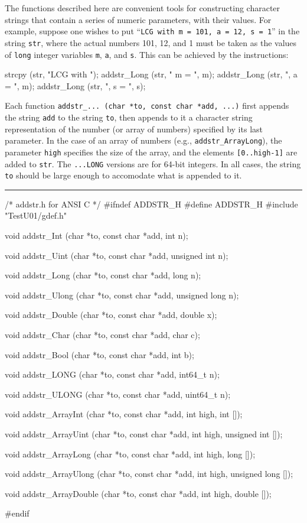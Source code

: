 
The functions described here are convenient tools for constructing
character strings that contain a series of numeric parameters,
with their values.
For example, suppose one wishes to put
``{\tt LCG with m = 101, a = 12, s = 1}'' in the string {\tt str},
where the actual
numbers 101, 12, and 1 must be taken as the values of {\tt long}
integer variables {\tt m}, {\tt a}, and {\tt s}.
This can be achieved by the instructions:
\vcode

   strcpy (str, "LCG with ");
   addstr\_Long (str, " m = ", m);
   addstr\_Long (str, ", a = ", m);
   addstr\_Long (str, ", s = ", s);
\endvcode

Each function {\tt addstr\_... (char *to, const char *add, ...)}
first appends the string {\tt add} to the string {\tt to}, then
appends to it a character string representation of the number
(or array of numbers) specified by its last parameter.
In the case of an array of numbers (e.g., {\tt addstr\_ArrayLong}),
the parameter {\tt high} specifies the size of the array, and the
elements {\tt [0..high-1]} are added to {\tt str}.
The {\tt ...LONG} versions are for 64-bit integers.
In all cases, the string {\tt to} should be large enough to accomodate
what is appended to it.


\bigskip\hrule
\code\hide
/*  addstr.h  for ANSI C  */
#ifndef ADDSTR_H
#define ADDSTR_H
\endhide
#include "TestU01/gdef.h"
\endcode

\code

void  addstr_Int (char *to, const char *add, int n);

void  addstr_Uint (char *to, const char *add, unsigned int n);

void  addstr_Long (char *to, const char *add, long n);

void  addstr_Ulong (char *to, const char *add, unsigned long n);

void  addstr_Double (char *to, const char *add, double x);

void  addstr_Char (char *to, const char *add, char c);

void  addstr_Bool (char *to, const char *add, int b);
\endcode
\code

void  addstr_LONG (char *to, const char *add, int64_t n);

void  addstr_ULONG (char *to, const char *add, uint64_t n);
\endcode
\code

void  addstr_ArrayInt (char *to, const char *add, int high, int []);

void  addstr_ArrayUint (char *to, const char *add, int high,
                        unsigned int []);

void  addstr_ArrayLong (char *to, const char *add, int high, long []);

void  addstr_ArrayUlong (char *to, const char *add, int high,
                         unsigned long []);

void  addstr_ArrayDouble (char *to, const char *add, int high, double []);

\hide
#endif
\endhide
\endcode

